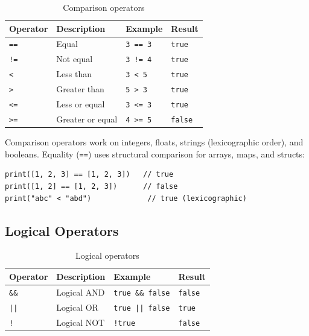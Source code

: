 \begin{table}[h]
\centering
\begin{tabular}{llll}
\toprule
\textbf{Operator} & \textbf{Description} & \textbf{Example} & \textbf{Result} \\
\midrule
\lstinline|==| & Equal & \lstinline|3 == 3| & \lstinline|true| \\
\lstinline|!=| & Not equal & \lstinline|3 != 4| & \lstinline|true| \\
\lstinline|<|  & Less than & \lstinline|3 < 5| & \lstinline|true| \\
\lstinline|>|  & Greater than & \lstinline|5 > 3| & \lstinline|true| \\
\lstinline|<=| & Less or equal & \lstinline|3 <= 3| & \lstinline|true| \\
\lstinline|>=| & Greater or equal & \lstinline|4 >= 5| & \lstinline|false| \\
\bottomrule
\end{tabular}
\caption{Comparison operators}\label{tab:comparison-operators}
\end{table}

Comparison operators work on integers, floats, strings (lexicographic order), and booleans.
Equality (\lstinline|==|) uses structural comparison for arrays, maps, and structs:

\begin{lstlisting}[language=Lattice, caption={Structural equality}]
print([1, 2, 3] == [1, 2, 3])   // true
print([1, 2] == [1, 2, 3])      // false
print("abc" < "abd")             // true (lexicographic)
\end{lstlisting}

\subsection{Logical Operators}\label{subsec:logical}

\begin{table}[h]
\centering
\begin{tabular}{llll}
\toprule
\textbf{Operator} & \textbf{Description} & \textbf{Example} & \textbf{Result} \\
\midrule
\lstinline|&&| & Logical AND & \lstinline|true && false| & \lstinline|false| \\
\lstinline!||! & Logical OR  & \lstinline!true || false! & \lstinline|true| \\
\lstinline|!|  & Logical NOT & \lstinline|!true| & \lstinline|false| \\
\bottomrule
\end{tabular}
\caption{Logical operators}\label{tab:logical-operators}
\end{table}

